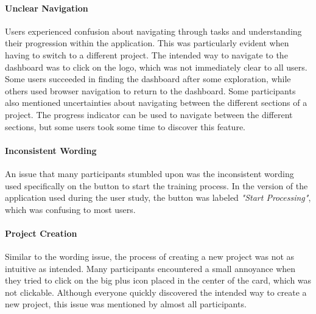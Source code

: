 \paragraph{Unclear Navigation}
Users experienced confusion about navigating through tasks and understanding their progression within the application.
This was particularly evident when having to switch to a different project.
The intended way to navigate to the dashboard was to click on the logo, which was not immediately clear to all users.
Some users succeeded in finding the dashboard after some exploration, while others used browser navigation to return to the dashboard.
\cite{P1, P4, P5, P6, P8, P10}
Some participants also mentioned uncertainties about navigating between the different sections of a project.
The progress indicator can be used to navigate between the different sections, but some users took some time to discover this feature.
\cite{P9}



\paragraph{Inconsistent Wording}
\label{sec:results:issues:inconsistent_wording}
An issue that many participants stumbled upon was the inconsistent wording used specifically on the button to start the training process.
In the version of the application used during the user study, the button was labeled \emph{"Start Processing"}, which was confusing to most users.
\cite{P2, P3, P6, P7, P8}



\paragraph{Project Creation}
Similar to the wording issue, the process of creating a new project was not as intuitive as intended.
Many participants encountered a small annoyance when they tried to click on the big plus icon placed in the center of the card, which was not clickable. 
Although everyone quickly discovered the intended way to create a new project, this issue was mentioned by almost all participants.
\cite{P3, P4, P5, P6, P7, P8}

